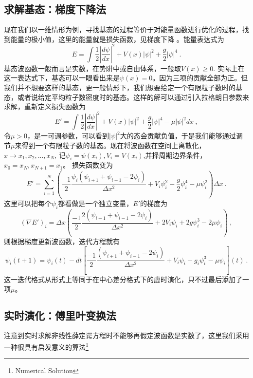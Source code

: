 \subsection{求解基态：梯度下降法}
现在我们以一维情形为例，寻找基态的过程等价于对能量函数进行优化的过程，找到能量的极小值，这里的能量就是损失函数，见梯度下降 。能量表达式为
\begin{equation}
E = \int \frac{1}{2}|\frac{d \psi}{dx}|^2 + V(x)|\psi|^2 + \frac{g}{2}|\psi|^4~.
\end{equation}
基态波函数一般而言是实数，在势阱中或自由体系，一般取$V(x)\ge 0$. 实际上在这一表达式下，基态可以一眼看出来是$\psi(x) = 0$。因为三项的贡献全部为正。但我们并不想要这样的基态，更一般情形下，我们想要给定一个有限粒子数时的基态，或者说给定平均粒子数密度时的基态。这样的解可以通过引入拉格朗日参数来求解，重新定义损失函数为
\begin{equation}
E' = \int \frac{1}{2}|\frac{d\psi}{dx}|^2 + V(x)|\psi|^2 + \frac{g}{2}|\psi|^4 -\mu |\psi|^2 dx ~,
\end{equation}
令$\mu>0$，是一可调参数，可以看到$|\psi|^2$大的态会贡献负值，于是我们能够通过调节$\mu$来得到一个有限粒子数的基态。现在将波函数在空间上离散化，$x\rightarrow x_1,x_2,...,x_N$, 记$\psi_i = \psi(x_i),V_i = V(x_i)$,并择周期边界条件，$x_0 = x_N, x_{N+1}= x_1$。 损失函数变为
\begin{equation}
E' =\sum_{i=1}^N (\frac{-1}{2} \frac{\psi_i(\psi_{i+1}+\psi_{i-1}-2\psi_i)}{\Delta x^2} + V_i\psi_{i}^2 + \frac{g}{2}\psi_i^4 - \mu \psi_i^2) \Delta x~.
\end{equation}
这里可以把每个$\psi_i$都看做是一个独立变量，$E'$的梯度为
\begin{equation}
(\nabla E')_i = \Delta x (\frac{-1}{2}\frac{2(\psi_{i+1}+\psi_{i-1}-2\psi_i)}{\Delta x^2} + 2V_i \psi_i + 2g \psi_i^3 - 2\mu \psi_i ) ~,
\end{equation}
则根据梯度更新波函数，迭代方程就有
\begin{equation}
\psi_i(t+1) = \psi_i(t) -dt [\frac{-1}{2}\frac{(\psi_{i+1} +\psi_{i-1}-2\psi_i )}{\Delta x^2} + V_i \psi_i + g_i \psi_i^3 -\mu \psi_i](t) ~.
\end{equation}
这一迭代格式从形式上等同于在中心差分格式下的虚时演化，只不过最后添加了一项$\mu$。

\subsection{实时演化：傅里叶变换法}

注意到实时求解非线性薛定谔方程时不能够再假定波函数是实数了，这里我们采用一种很具有启发意义的算法\footnote{Numerical Solution}
